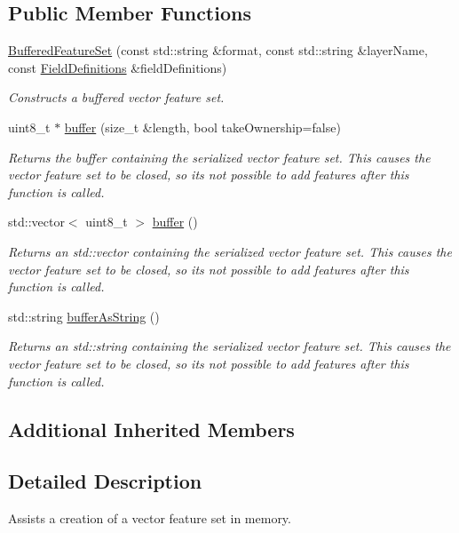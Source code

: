 \subsection*{Public Member Functions}
\begin{DoxyCompactItemize}
\item 
\hyperlink{group___vector_module_ga13bed828345853b15d61ba90d6df392e}{Buffered\+Feature\+Set} (const std\+::string \&format, const std\+::string \&layer\+Name, const \hyperlink{namespacedg_1_1deepcore_1_1vector_a89a39c2fa657ff95f116cfed4a951386}{Field\+Definitions} \&field\+Definitions)
\begin{DoxyCompactList}\small\item\em Constructs a buffered vector feature set. \end{DoxyCompactList}\item 
uint8\+\_\+t $\ast$ \hyperlink{group___vector_module_ga3541fd309ad0269dbdb1a64657a5a11d}{buffer} (size\+\_\+t \&length, bool take\+Ownership=false)
\begin{DoxyCompactList}\small\item\em Returns the buffer containing the serialized vector feature set. This causes the vector feature set to be closed, so it\textquotesingle{}s not possible to add features after this function is called. \end{DoxyCompactList}\item 
std\+::vector$<$ uint8\+\_\+t $>$ \hyperlink{group___vector_module_ga0a390de9fa273210eb7d905538d22b19}{buffer} ()
\begin{DoxyCompactList}\small\item\em Returns an std\+::vector containing the serialized vector feature set. This causes the vector feature set to be closed, so it\textquotesingle{}s not possible to add features after this function is called. \end{DoxyCompactList}\item 
std\+::string \hyperlink{group___vector_module_gaa41d91dcbee14ef2363b9acecb332b1f}{buffer\+As\+String} ()
\begin{DoxyCompactList}\small\item\em Returns an std\+::string containing the serialized vector feature set. This causes the vector feature set to be closed, so it\textquotesingle{}s not possible to add features after this function is called. \end{DoxyCompactList}\end{DoxyCompactItemize}
\subsection*{Additional Inherited Members}


\subsection{Detailed Description}
Assists a creation of a vector feature set in memory. 